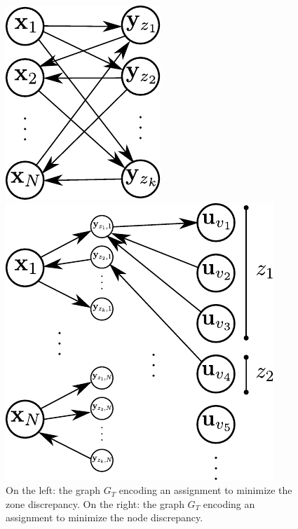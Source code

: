 \documentclass[]{article}
\begin{document}
\begin{figure}[t]
	\centering
	\begin{minipage}{.40\linewidth}
		\centering
		\includegraphics[width=.8\linewidth]{figures/mini_zone}
	\end{minipage}
	\begin{minipage}{.55\linewidth}
		\centering
		\includegraphics[width=.8\linewidth]{figures/mini_node}
	\end{minipage}
	\caption{On the left: the graph $G_T$ encoding an assignment to minimize the zone discrepancy. On the right: the graph $G_T$ encoding an assignment to minimize the node discrepancy.}
\end{figure}
\end{document}
